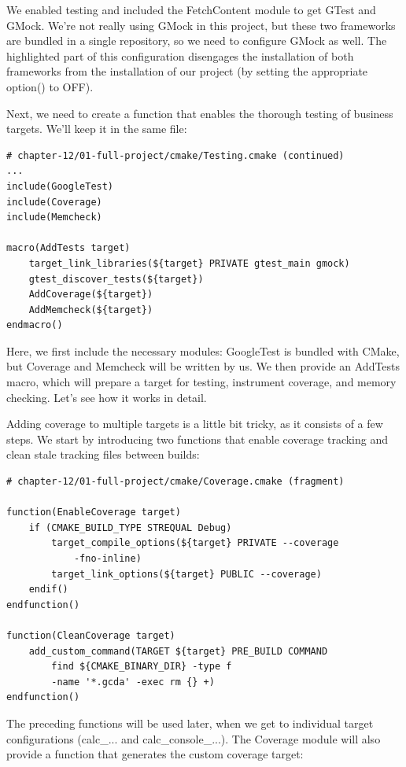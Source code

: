 We enabled testing and included the FetchContent module to get GTest and GMock. We're not really using GMock in this project, but these two frameworks are bundled in a single repository, so we need to configure GMock as well. The highlighted part of this configuration disengages the installation of both frameworks from the installation of our project (by setting the appropriate option() to OFF).

Next, we need to create a function that enables the thorough testing of business targets. We'll keep it in the same file:

\begin{lstlisting}[style=styleCMake]
# chapter-12/01-full-project/cmake/Testing.cmake (continued)
...
include(GoogleTest)
include(Coverage)
include(Memcheck)

macro(AddTests target)
	target_link_libraries(${target} PRIVATE gtest_main gmock)
	gtest_discover_tests(${target})
	AddCoverage(${target})
	AddMemcheck(${target})
endmacro()
\end{lstlisting}

Here, we first include the necessary modules: GoogleTest is bundled with CMake, but Coverage and Memcheck will be written by us. We then provide an AddTests macro, which will prepare a target for testing, instrument coverage, and memory checking. Let's see how it works in detail.


Adding coverage to multiple targets is a little bit tricky, as it consists of a few steps. We start by introducing two functions that enable coverage tracking and clean stale tracking files between builds:

\begin{lstlisting}[style=styleCMake]
# chapter-12/01-full-project/cmake/Coverage.cmake (fragment)

function(EnableCoverage target)
	if (CMAKE_BUILD_TYPE STREQUAL Debug)
		target_compile_options(${target} PRIVATE --coverage
			-fno-inline)
		target_link_options(${target} PUBLIC --coverage)
	endif()
endfunction()

function(CleanCoverage target)
	add_custom_command(TARGET ${target} PRE_BUILD COMMAND
		find ${CMAKE_BINARY_DIR} -type f
		-name '*.gcda' -exec rm {} +)
endfunction()
\end{lstlisting}

The preceding functions will be used later, when we get to individual target configurations (calc\_... and calc\_console\_...). The Coverage module will also provide a function that generates the custom coverage target:

